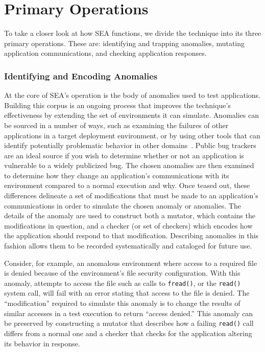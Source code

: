 \section{Primary Operations}
\label{SEC:PrimaryOperations}

To take a closer look at how SEA functions,
we divide the technique
into its three primary operations.
These are:
identifying and trapping anomalies,
mutating application communications,
and checking application responses.

\subsubsection{Identifying and Encoding Anomalies}
\label{SUBSUB:IdentifyingAndEncoding}
At the core of SEA's operation is the body of anomalies
used to test applications.
Building this corpus is an ongoing process that improves the technique's
effectiveness by extending the set of environments it can simulate.
Anomalies can be sourced
in a number of ways,
such as
examining the failures of other applications
in a target deployment environment,
or by using other tools that can identify
potentially problematic behavior in other domains~\cite{Zhuang_NSDI_2014,
rasley2015detecting}.
Public bug trackers are an ideal source
if you wish to determine
whether or not an application
is vulnerable to a widely publicized bug.
The chosen anomalies are then examined
to determine how they change an application's communications
with its environment
compared to a normal execution and why.
Once teased out,
these differences delineate
a set of modifications
that must be made to an application's communications
in order to simulate the chosen anomaly or anomalies.
The details of the anomaly are used to
construct both a mutator,
which contains the modifications in question,
and a checker
(or set of checkers)
which encodes how the application should respond to that modification.
Describing anomalies in this fashion
allows them to be recorded systematically and cataloged for future use.

Consider,
for example,
an anomalous environment
where access to a required file is denied because of
the environment's file security configuration.
With this anomaly,
attempts to access the file
such as calls to {\tt fread()},
or the {\tt read()} system call,
will fail with an error stating that access to the file is denied.
The ``modification'' required to simulate this anomaly
is to change the results of similar accesses
in a test execution
to return ``access denied.''
This anomaly can be preserved by constructing a mutator that describes how
a failing {\tt read()} call differs from a normal one and a checker that checks for
the application altering its behavior in response.

